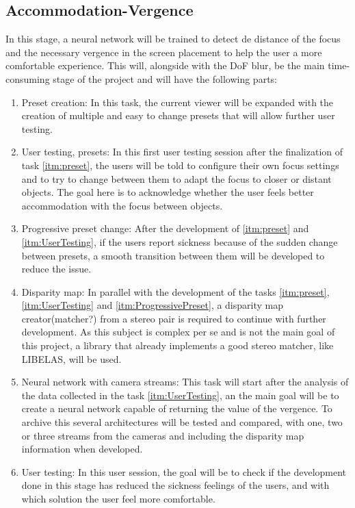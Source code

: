 \documentclass[10pt,a4paper,twocolumn,twoside]{article}
\begin{document}
\subsection{Accommodation-Vergence}
\label{subsec:vergence}
In this stage, a neural network will be trained to detect de distance of the focus and the necessary vergence in the screen placement to help the user a more comfortable experience.
This will, alongside with the DoF blur, be the main time-consuming stage of the project and will have the following parts:
\begin{enumerate}
	\item \label{itm:preset}  Preset creation: In this task, the current viewer will be expanded with the creation of multiple and easy to change presets that will allow further user testing.
	
	\item \label{itm:UserTesting} User testing, presets: In this first user testing session after the finalization of task \ref{itm:preset}, the users will be told to configure their own focus settings and to try to change between them to adapt the focus to closer or distant objects. The goal here is to acknowledge whether the user feels better accommodation with the focus between objects.
	
	\item \label{itm:ProgressivePreset} Progressive preset change: After the development of \ref{itm:preset} and \ref{itm:UserTesting}, if the users report sickness because of the sudden change between presets, a smooth transition between them will be developed to reduce the issue. 
	
	\item Disparity map: In parallel with the development of the tasks \ref{itm:preset},\ref{itm:UserTesting} and \ref{itm:ProgressivePreset}, a disparity map creator(matcher?) from a stereo pair is required to continue with further development. As this subject is complex per se and is not the main goal of this project, a library that already implements a good stereo matcher, like LIBELAS\cite{LIBELAS}, will be used. 
	
	\item Neural network with camera streams: This task will start after the analysis of the data collected in the task \ref{itm:UserTesting}, an the main goal will be to create a neural network capable of returning the value of the vergence. To archive this several architectures will be tested and compared, with one, two or three streams from the cameras and including the disparity map information when developed.
	
	\item User testing: In this user session, the goal will be to check if the development done in this stage has reduced the sickness feelings of the users, and with which solution the user feel more comfortable.
\end{enumerate}
\end{document}
